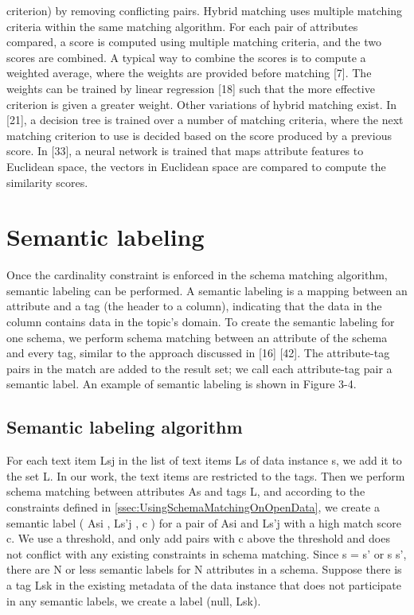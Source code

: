 criterion) by removing conflicting pairs. Hybrid matching uses multiple matching criteria within the same matching algorithm. For each pair of attributes compared, a score is computed using multiple matching criteria, and the two scores are combined. A typical way to combine the scores is to compute a weighted average, where the weights are provided before matching \cite{DBLP:journals/debu/ChenGHTD18}[7]. The weights can be trained by linear regression \cite{Ehrig2004QOM}[18] such that the more effective criterion is given a greater weight. Other variations of hybrid matching exist. In \cite{Giunchiglia2005Semantic}[21], a decision tree is trained over a number of matching criteria, where the next matching criterion to use is decided based on the score produced by a previous score. In \cite{Moawed2018Arabian}[33], a neural network is trained that maps attribute features to Euclidean space, the vectors in Euclidean space are compared to compute the similarity scores.

\section{Semantic labeling}
\label{sec:SemanticLabeling}

Once the cardinality constraint is enforced in the schema matching algorithm, semantic labeling can be performed. A semantic labeling is a mapping between an attribute and a tag (the header to a column), indicating that the data in the column contains data in the topic's domain. To create the semantic labeling for one schema, we perform schema matching between an attribute of the schema and every tag, similar to the approach discussed in \cite{Dong2012Proceedings}[16] \cite{Salakhutdinov2009Semantic}[42]. The attribute-tag pairs in the match are added to the result set; we call each attribute-tag pair a semantic label. An example of semantic labeling is shown in Figure 3-4.

\subsection{Semantic labeling algorithm}
\label{ssec:SemanticLabelingAlgorithm}

For each text item Lsj in the list of text items Ls of data instance s, we add it to the set L. In our work, the text items are restricted to the tags. Then we perform schema matching between attributes As and tags L, and according to the constraints defined in \autoref{ssec:UsingSchemaMatchingOnOpenData}, we create a semantic label ( Asi , Ls'j , c ) for a pair of Asi and Ls'j with a high match score c. We use a threshold, and only add pairs with c above the threshold and does not conflict with any existing constraints in schema matching. Since s = s' or s s', there are N or less semantic labels for N attributes in a schema.
Suppose there is a tag Lsk in the existing metadata of the data instance that does not participate in any semantic labels, we create a label (null, Lsk).

